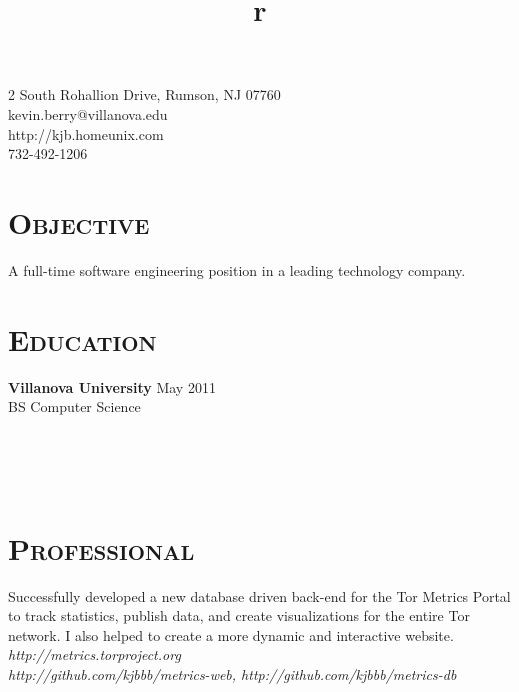 \begin{resume}
\begin{flushright}
2 South Rohallion Drive, Rumson, NJ 07760 \\
kevin.berry@villanova.edu \\
http://kjb.homeunix.com \\
732-492-1206 \\
\end{flushright}

\section{\textsc{Objective}}
A full-time software engineering position in a leading technology company.
\section{\textsc{Education}}

\textbf{Villanova University} \hfill May 2011 \\
BS Computer Science


\begin{formatb}
  \title{r}\\
  \\
  \body\\
\end{formatb}

\section{\textsc{Professional}}

\title{}
\begin{position}
Successfully developed a new database driven back-end for the Tor Metrics Portal
to track statistics, publish data, and create visualizations for the entire Tor
network.  I also helped to create a more dynamic and interactive website. \\
{\itshape http://metrics.torproject.org} \\ {\itshape
http://github.com/kjbbb/metrics-web, http://github.com/kjbbb/metrics-db}
\end{position}


\end{resume}
